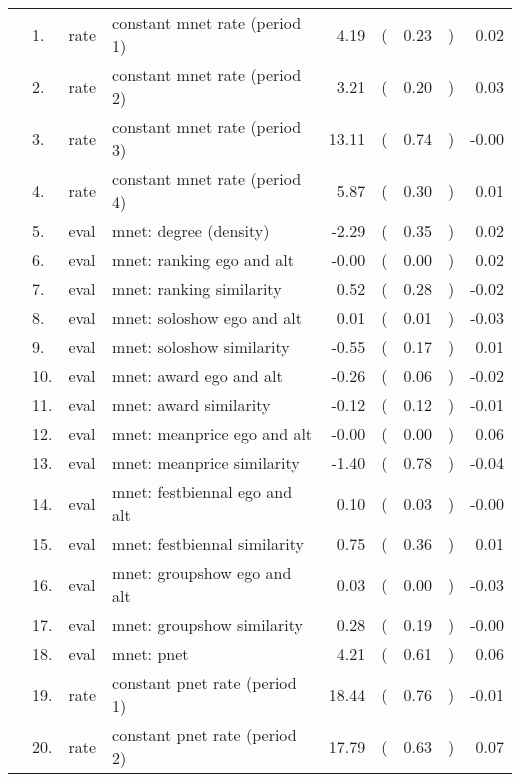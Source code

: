 \begin{table}[ht]
\centering
\begin{tabular}{llllrlrlr}
  \hline
  \hline
  &  1. & rate & constant mnet rate (period 1) & 4.19 & ( & 0.23 & ) & 0.02 \\ 
    &  2. & rate & constant mnet rate (period 2) & 3.21 & ( & 0.20 & ) & 0.03 \\ 
    &  3. & rate & constant mnet rate (period 3) & 13.11 & ( & 0.74 & ) & -0.00 \\ 
    &  4. & rate & constant mnet rate (period 4) & 5.87 & ( & 0.30 & ) & 0.01 \\ 
    &  5. & eval & mnet: degree (density) & -2.29 & ( & 0.35 & ) & 0.02 \\ 
    &  6. & eval & mnet: ranking ego and alt & -0.00 & ( & 0.00 & ) & 0.02 \\ 
    &  7. & eval & mnet: ranking similarity & 0.52 & ( & 0.28 & ) & -0.02 \\ 
    &  8. & eval & mnet: soloshow ego and alt & 0.01 & ( & 0.01 & ) & -0.03 \\ 
    &  9. & eval & mnet: soloshow similarity & -0.55 & ( & 0.17 & ) & 0.01 \\ 
    & 10. & eval & mnet: award ego and alt & -0.26 & ( & 0.06 & ) & -0.02 \\ 
    & 11. & eval & mnet: award similarity & -0.12 & ( & 0.12 & ) & -0.01 \\ 
    & 12. & eval & mnet: meanprice ego and alt & -0.00 & ( & 0.00 & ) & 0.06 \\ 
    & 13. & eval & mnet: meanprice similarity & -1.40 & ( & 0.78 & ) & -0.04 \\ 
    & 14. & eval & mnet: festbiennal ego and alt & 0.10 & ( & 0.03 & ) & -0.00 \\ 
    & 15. & eval & mnet: festbiennal similarity & 0.75 & ( & 0.36 & ) & 0.01 \\ 
    & 16. & eval & mnet: groupshow ego and alt & 0.03 & ( & 0.00 & ) & -0.03 \\ 
    & 17. & eval & mnet: groupshow similarity & 0.28 & ( & 0.19 & ) & -0.00 \\ 
    & 18. & eval & mnet: pnet & 4.21 & ( & 0.61 & ) & 0.06 \\ 
    & 19. & rate & constant pnet rate (period 1) & 18.44 & ( & 0.76 & ) & -0.01 \\ 
    & 20. & rate & constant pnet rate (period 2) & 17.79 & ( & 0.63 & ) & 0.07 \\ 

\end{tabular}
\end{table}

